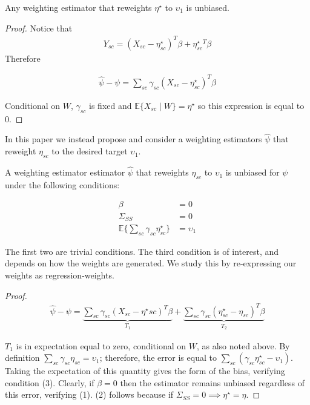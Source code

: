 \begin{proposition}
    Any weighting estimator that reweights $\eta^\star$ to $\upsilon_1$ is unbiased.
\end{proposition}

\begin{proof}
    Notice that 
    \begin{align*}
        Y_{sc} = (X_{sc} - \eta^\star_{sc})^T\beta + \eta^\star_{sc}^T\beta
    \end{align*}
    Therefore
    
    \begin{align*}
        \hat{\psi} - \psi = \sum_{sc}\gamma_{sc}(X_{sc} - \eta^\star_{sc})^T\beta
    \end{align*}
    
    Conditional on $W$, $\gamma_{sc}$ is fixed and $\mathbb{E}\{X_{sc} \mid W\} = \eta^\star$ so this expression is equal to 0.
\end{proof}

In this paper we instead propose and consider a weighting estimators $\hat{\psi}$ that reweight $\eta_{sc}$ to the desired target $\upsilon_1$.

\begin{proposition}

A weighting estimator estimator $\hat{\psi}$ that reweights $\eta_{sc}$ to $\upsilon_1$ is unbiased for $\psi$ under the following conditions:

\begin{align}
    \beta &= 0 \\
    \Sigma_{SS} &= 0 \\
    \mathbb{E}\{\sum_{sc}\gamma_{sc}\eta^\star_{sc}\} &= \upsilon_1
\end{align}
\end{proposition}

The first two are trivial conditions. The third condition is of interest, and depends on how the weights are generated. We study this by re-expressing our weights as regression-weights.

\begin{proof}
    \begin{align*}
    \hat{\psi} - \psi = \underbrace{\sum_{sc}\gamma_{sc}(X_{sc} - \eta^\star{sc})^T\beta}_{T_1} + \underbrace{\sum_{sc}\gamma_{sc}(\eta^\star_{sc} - \eta_{sc})^T\beta}
    _{T_2}
    \end{align*}
    
    $T_1$ is in expectation equal to zero, conditional on $W$, as also noted above. By definition $\sum_{sc}\gamma_{sc}\eta_{sc} = \upsilon_1$; therefore, the error is equal to $\sum_{sc}(\gamma_{sc}\eta^\star_{sc} - \upsilon_1)$. Taking the expectation of this quantity gives the form of the bias, verifying condition (3). Clearly, if $\beta = 0$ then the estimator remains unbiased regardless of this error, verifying (1). (2) follows because if $\Sigma_{SS} = 0 \implies \eta^\star = \eta$.
\end{proof}

